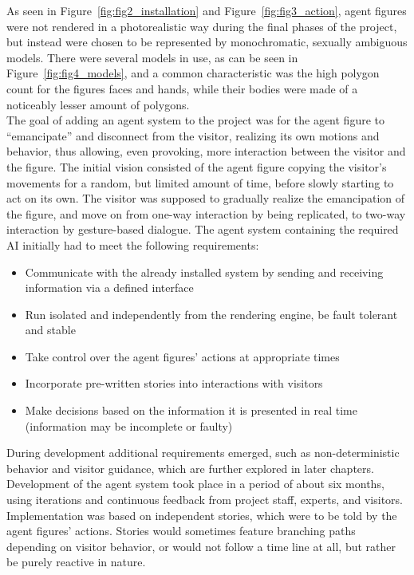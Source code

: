 \documentclass[draft,final]{vutinfth} %
\begin{document}
As seen in Figure~\ref{fig:fig2_installation} and Figure~\ref{fig:fig3_action}, agent figures were not rendered in a photorealistic way during the final phases of the project, but instead were chosen to be represented by monochromatic, sexually ambiguous models. 
There were several models in use, as can be seen in Figure~\ref{fig:fig4_models}, and a common characteristic was the high polygon count for the figures faces and hands, while their bodies were made of a noticeably lesser amount of polygons.\\
The goal of adding an agent system to the project was for the agent figure to “emancipate” and disconnect from the visitor, realizing its own motions and behavior, thus allowing, even provoking, more interaction between the visitor and the figure. 
The initial vision consisted of the agent figure copying the visitor’s movements for a random, but limited amount of time, before slowly starting to act on its own. 
The visitor was supposed to gradually realize the emancipation of the figure, and move on from one-way interaction by being replicated, to two-way interaction by gesture-based dialogue.
The agent system containing the required AI initially had to meet the following requirements:
\begin{itemize}
	\item Communicate with the already installed system by sending and receiving information via a defined interface
	\item Run isolated and independently from the rendering engine, be fault tolerant and stable
	\item Take control over the agent figures’ actions at appropriate times
	\item Incorporate pre-written stories into interactions with visitors
	\item Make decisions based on the information it is presented in real time (information may be incomplete or faulty)
\end{itemize}
During development additional requirements emerged, such as non-deterministic behavior and visitor guidance, which are further explored in later chapters. \\
Development of the agent system took place in a period of about six months, using iterations and continuous feedback from project staff, experts, and visitors. 
Implementation was based on independent stories, which were to be told by the agent figures’ actions. 
Stories would sometimes feature branching paths depending on visitor behavior, or would not follow a time line at all, but rather be purely reactive in nature. 
\end{document}
